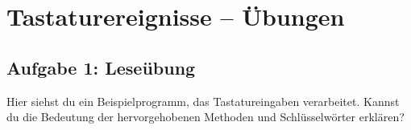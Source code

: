 \clearpage

\rehead[]{\textcolor{lightblue}{AvHG, Inf, My}}
\lohead[]{\textcolor{lightblue}{AvHG, Inf, My}}

\section{Tastaturereignisse -- Übungen}

\subsection{Aufgabe 1: Leseübung}

Hier siehst du ein Beispielprogramm, das Tastatureingaben verarbeitet.
Kannst du die Bedeutung der hervorgehobenen Methoden und Schlüsselwörter
erklären?

